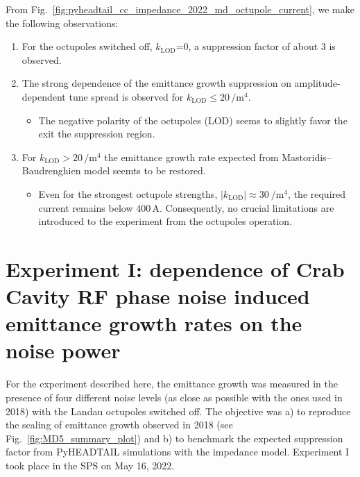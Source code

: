 From Fig.~\ref{fig:pyheadtail_cc_impedance_2022_md_octupole_current}, we make the following observations:
\begin{enumerate}
   \item For the octupoles switched off, $k_\mathrm{LOD}$=0, a suppression factor of about 3 is observed.
   \item The strong dependence of the emittance growth suppression on amplitude-dependent tune spread is observed for $k_\mathrm{LOD} \leq 20$\,$\mathrm{/m^4}$.
      \begin{itemize}
         \item The negative polarity of the octupoles (LOD) seems to slightly favor the exit the suppression region.
      \end{itemize}
   \item For $k_\mathrm{LOD} > 20$\,$\mathrm{/m^4}$ the emittance growth rate expected from Mastoridis--Baudrenghien model seemts to be restored. 
      \begin{itemize}
         \item Even for the strongest octupole strengths, $| k_\mathrm{LOD} |\approx 30 \ \mathrm{/m^4}$, the required current remains below 400\,A. Consequently, no crucial limitations are introduced to the experiment from the octupoles operation.
      \end{itemize}
\end{enumerate}


\section{Experiment I: dependence of Crab Cavity RF phase noise induced emittance growth rates on the noise power}\label{subsec:cc_md_2022_noise_scan} 

For the experiment described here, the emittance growth was measured in the presence of four different noise levels (as close as possible with the ones used in 2018) with the Landau octupoles switched off. The objective was a) to reproduce the scaling of emittance growth observed in 2018 (see Fig.~\ref{fig:MD5_summary_plot}) and b) to benchmark the expected suppression factor from PyHEADTAIL simulations with the impedance model. Experiment I took place in the SPS on May 16, 2022.

